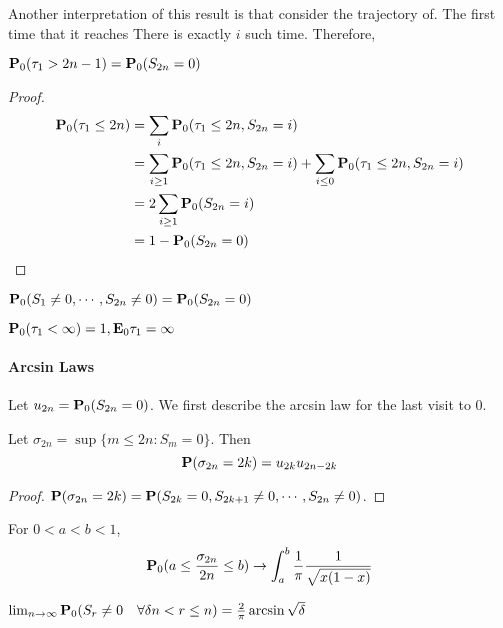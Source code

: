 \begin{remark}
    Another interpretation of this result is that consider the trajectory of.
    The first time that it reaches 
    There is exactly $i$ such time. Therefore, 
\end{remark}
\begin{theorem}
    $\mathbf{P}_0(\tau_1>2n-1)=\mathbf{P}_0(S_{2n}=0)$
\end{theorem}
\begin{proof}
    \begin{align*}
        \mathbf{P}_0(\tau_1\leq 2n)&=\sum_i \mathbf{P}_0(\tau_1\leq 2n,S_{2n}=i)\\
        &=\sum_{i\geq 1} \mathbf{P}_0(\tau_1\leq 2n,S_{2n}=i)+\sum_{i\leq 0} \mathbf{P}_0(\tau_1\leq 2n,S_{2n}=i)\\
        &=2\sum_{i\geq 1} \mathbf{P}_0(S_{2n}=i)\\
        &=1-\mathbf{P}_0(S_{2n}=0)
    \end{align*}
\end{proof}
\begin{remark}
    $\mathbf{P}_0(S_1\neq 0,\cdots,S_{2n}\neq 0)=\mathbf{P}_0(S_{2n}=0)$
\end{remark}

\begin{theorem}
    
\end{theorem}

\begin{corollary}
    $\mathbf{P}_0(\tau_1<\infty)=1,\mathbf{E}_0\tau_1=\infty$
\end{corollary}

\paragraph{Arcsin Laws}
Let $u_{2n}=\mathbf{P}_0(S_{2n}=0)$. We first describe the arcsin law for the last visit to $0$.
\begin{lemma}
    Let $\sigma_{2n}=\sup\{m\leq 2n:S_m=0\} $. Then 
    \[\mathbf{P}(\sigma_{2n}=2k)=u_{2k}u_{2n-2k} \] 
\end{lemma}
\begin{proof}
    $\mathbf{P}(\sigma_{2n}=2k)=\mathbf{P}(S_{2k}=0,S_{2k+1}\neq 0,\cdots,S_{2n}\neq 0)$.
\end{proof}

\begin{theorem}
    For $0<a<b<1$,
    \[ \mathbf{P}_0(a\leq \frac{\sigma_{2n}}{2n}\leq b)\to \int_{a}^{b}\frac{1}{\pi}\frac{1}{\sqrt{x(1-x)}}\]
\end{theorem}
\begin{corollary}
    $\lim_{n\to\infty}\mathbf{P}_0(S_r\neq 0 \quad\forall \delta n<r\leq n)=\frac{2}{\pi}\arcsin \sqrt{\delta}$
\end{corollary}

